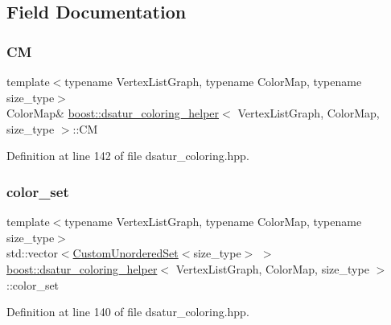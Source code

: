 \subsection{Field Documentation}
\mbox{\label{classboost_1_1dsatur__coloring__helper_a542a95aaddde529e2ab8a11cb5535010}} 
\subsubsection{\texorpdfstring{CM}{CM}}
{\footnotesize\ttfamily template$<$typename Vertex\+List\+Graph, typename Color\+Map, typename size\+\_\+type$>$ \\
Color\+Map\& \hyperlink{classboost_1_1dsatur__coloring__helper}{boost\+::dsatur\+\_\+coloring\+\_\+helper}$<$ Vertex\+List\+Graph, Color\+Map, size\+\_\+type $>$\+::CM\hspace{0.3cm}{\ttfamily [private]}}



Definition at line 142 of file dsatur\+\_\+coloring.\+hpp.

\mbox{\label{classboost_1_1dsatur__coloring__helper_a3a8f27a4c2da00293736b71ac6f900c5}} 
\subsubsection{\texorpdfstring{color\+\_\+set}{color\_set}}
{\footnotesize\ttfamily template$<$typename Vertex\+List\+Graph, typename Color\+Map, typename size\+\_\+type$>$ \\
std\+::vector$<$\hyperlink{classCustomUnorderedSet}{Custom\+Unordered\+Set}$<$size\+\_\+type$>$ $>$ \hyperlink{classboost_1_1dsatur__coloring__helper}{boost\+::dsatur\+\_\+coloring\+\_\+helper}$<$ Vertex\+List\+Graph, Color\+Map, size\+\_\+type $>$\+::color\+\_\+set\hspace{0.3cm}{\ttfamily [private]}}



Definition at line 140 of file dsatur\+\_\+coloring.\+hpp.

